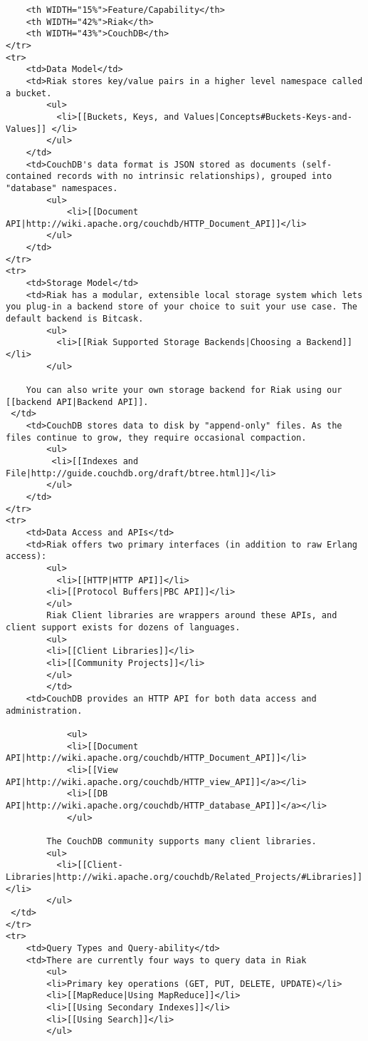\documentclass[letter]{book}
\newcounter{tab}[chapter]
\begin{document}
\begin{shaded}\begin{verbatim}
    <th WIDTH="15%">Feature/Capability</th>
    <th WIDTH="42%">Riak</th>
    <th WIDTH="43%">CouchDB</th>
</tr>
<tr>
    <td>Data Model</td>
    <td>Riak stores key/value pairs in a higher level namespace called a bucket.
        <ul>
          <li>[[Buckets, Keys, and Values|Concepts#Buckets-Keys-and-Values]] </li>
        </ul>
    </td>
    <td>CouchDB's data format is JSON stored as documents (self-contained records with no intrinsic relationships), grouped into "database" namespaces.
        <ul>
            <li>[[Document API|http://wiki.apache.org/couchdb/HTTP_Document_API]]</li>
        </ul>
    </td>
</tr>
<tr>
    <td>Storage Model</td>
    <td>Riak has a modular, extensible local storage system which lets you plug-in a backend store of your choice to suit your use case. The default backend is Bitcask.
        <ul>
          <li>[[Riak Supported Storage Backends|Choosing a Backend]]</li>
        </ul>

    You can also write your own storage backend for Riak using our [[backend API|Backend API]].
 </td>
    <td>CouchDB stores data to disk by "append-only" files. As the files continue to grow, they require occasional compaction.
        <ul>
         <li>[[Indexes and File|http://guide.couchdb.org/draft/btree.html]]</li>
        </ul>
    </td>
</tr>
<tr>
    <td>Data Access and APIs</td>
    <td>Riak offers two primary interfaces (in addition to raw Erlang access):
		<ul>
		  <li>[[HTTP|HTTP API]]</li>
		<li>[[Protocol Buffers|PBC API]]</li>
		</ul>
		Riak Client libraries are wrappers around these APIs, and client support exists for dozens of languages. 
		<ul>
		<li>[[Client Libraries]]</li>
		<li>[[Community Projects]]</li>
		</ul>
		</td>
    <td>CouchDB provides an HTTP API for both data access and administration.

            <ul>
            <li>[[Document API|http://wiki.apache.org/couchdb/HTTP_Document_API]]</li>
            <li>[[View API|http://wiki.apache.org/couchdb/HTTP_view_API]]</a></li>
            <li>[[DB API|http://wiki.apache.org/couchdb/HTTP_database_API]]</a></li>
            </ul>

        The CouchDB community supports many client libraries.
        <ul>
          <li>[[Client-Libraries|http://wiki.apache.org/couchdb/Related_Projects/#Libraries]]</li>
        </ul>
 </td>
</tr>
<tr>
    <td>Query Types and Query-ability</td>
    <td>There are currently four ways to query data in Riak
        <ul>
        <li>Primary key operations (GET, PUT, DELETE, UPDATE)</li>
        <li>[[MapReduce|Using MapReduce]]</li>
        <li>[[Using Secondary Indexes]]</li>
        <li>[[Using Search]]</li>
        </ul>


\end{verbatim}
\end{shaded}
\end{document}
